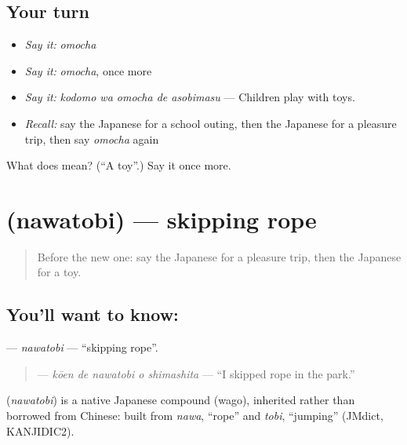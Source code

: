 \subsection*{Your turn}
\begin{itemize}
\raggedright
  \item \emph{Say it:} \emph{omocha}
  \item \emph{Say it:} \emph{omocha}, once more
  \item \emph{Say it:} \emph{kodomo wa omocha de asobimasu} — Children play with toys.
  \item \emph{Recall:} say the Japanese for a school outing, then the Japanese for a pleasure trip, then say \emph{omocha} again
\end{itemize}

\begin{tcolorbox}[breakable,colback=teal!4,colframe=teal!35!black,title={Before you move on}]
What does  mean? (\textquotedblleft{}A toy\textquotedblright{}.) Say it once more.
\end{tcolorbox}
\section[\texorpdfstring{\ja{なわとび} (nawatobi)}{なわとび (nawatobi)}]{ (nawatobi) — skipping rope}

\label{lesson:JA-C500-nawatobi}



\begin{quote}
Before the new one: say the Japanese for a pleasure trip, then the Japanese for a toy.
\end{quote}

\subsection*{You'll want to know: }
\textbf{} — \emph{nawatobi} — \textquotedblleft{}skipping rope\textquotedblright{}.

\begin{quote}
\textbf{  } — \emph{kōen de nawatobi o shimashita} — \textquotedblleft{}I skipped rope in the park.\textquotedblright{}
\end{quote}

\begin{cousinweb}
\textbf{} (\emph{nawatobi}) is a native Japanese compound (wago), inherited rather than borrowed from Chinese: built from \emph{nawa}, \textquotedblleft{}rope\textquotedblright{} and \emph{tobi}, \textquotedblleft{}jumping\textquotedblright{} (JMdict, KANJIDIC2).
\end{cousinweb}

